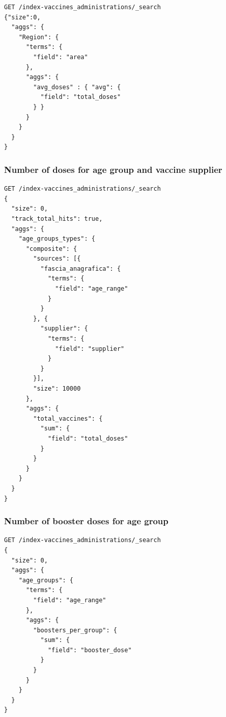 \documentclass[12pt, a4paper]{article}
\begin{document}
\begin{tcolorbox}[fontupper=\scriptsize]
    \begin{verbatim}
GET /index-vaccines_administrations/_search
{"size":0,
  "aggs": {
    "Region": {
      "terms": {
        "field": "area"
      },
      "aggs": {
        "avg_doses" : { "avg": {
          "field": "total_doses"
        } } 
      }
    }
  }
}

    \end{verbatim}
\end{tcolorbox}

\noindent
\blindtext

\subsubsection{Number of doses for age group and vaccine supplier}

\begin{tcolorbox}[fontupper=\scriptsize]
    \begin{verbatim}
GET /index-vaccines_administrations/_search
{
  "size": 0,
  "track_total_hits": true,
  "aggs": {
    "age_groups_types": {
      "composite": {
        "sources": [{
          "fascia_anagrafica": {
            "terms": { 
              "field": "age_range"
            }
          }
        }, {
          "supplier": {
            "terms": { 
              "field": "supplier"
            }
          }
        }], 
        "size": 10000
      },
      "aggs": {
        "total_vaccines": {
          "sum": {
            "field": "total_doses"
          }
        }
      }
    }
  }
}
    \end{verbatim}
\end{tcolorbox}

\noindent
\blindtext

\subsubsection{Number of booster doses for age group}

\begin{tcolorbox}[fontupper=\scriptsize]
    \begin{verbatim}
GET /index-vaccines_administrations/_search
{
  "size": 0,
  "aggs": {
    "age_groups": {
      "terms": { 
        "field": "age_range" 
      },
      "aggs": {
        "boosters_per_group": {
          "sum": {
            "field": "booster_dose"
          }
        }
      }
    }
  }
}
    \end{verbatim}
\end{tcolorbox}
\end{document}
